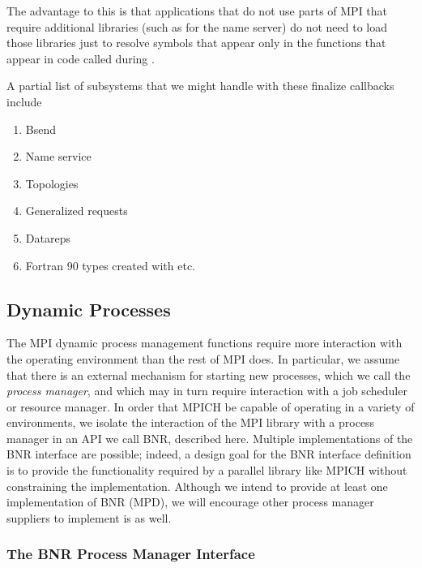 \documentclass{article}
\begin{document}
The advantage to this is that applications that do not use parts of
MPI that require additional libraries (such as  for the
name server) do not need to load those libraries just to resolve
symbols that appear only in the functions that appear in code called
during .  


A partial list of subsystems that we might handle with these finalize
callbacks include 
\begin{enumerate}
\item Bsend 
\item Name service
\item Topologies
\item Generalized requests
\item Datareps
\item Fortran 90 types created with  etc.
\end{enumerate}

\subsection{Dynamic Processes}
\label{sec:spawn}

The MPI dynamic process management functions require more interaction with the
operating environment than the rest of MPI does.  In particular, we assume
that there is an external mechanism for starting new processes, which we call
the {\em process manager}, and which may in turn require interaction with a
job scheduler or resource manager.  In order that MPICH be capable of
operating in a variety of environments, we isolate the interaction of the MPI
library with a process manager in an API we call BNR, described here.
Multiple implementations of the BNR interface are possible;  indeed, a
design goal for the BNR interface definition is to provide the functionality
required by a parallel library like MPICH without constraining the
implementation.  Although we intend to provide at least one implementation of
BNR (MPD), we will encourage other process manager suppliers to implement is
as well.

\subsubsection{The BNR Process Manager Interface}
\label{sec:bnr}
\end{document}

